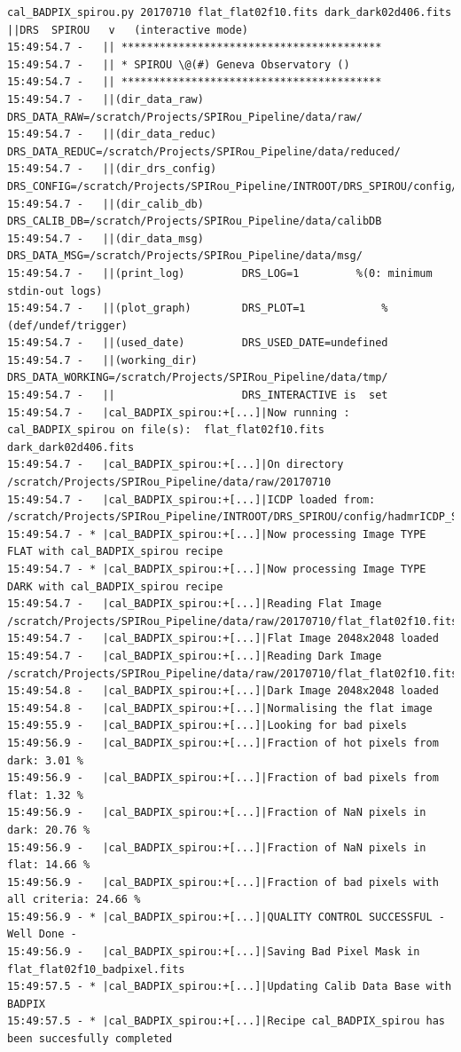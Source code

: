 \begin{lstlisting}[style=text]
cal_BADPIX_spirou.py 20170710 flat_flat02f10.fits dark_dark02d406.fits
||DRS  SPIROU   v   (interactive mode)
15:49:54.7 -   || *****************************************
15:49:54.7 -   || * SPIROU \@(#) Geneva Observatory ()
15:49:54.7 -   || *****************************************
15:49:54.7 -   ||(dir_data_raw)      DRS_DATA_RAW=/scratch/Projects/SPIRou_Pipeline/data/raw/
15:49:54.7 -   ||(dir_data_reduc)    DRS_DATA_REDUC=/scratch/Projects/SPIRou_Pipeline/data/reduced/
15:49:54.7 -   ||(dir_drs_config)    DRS_CONFIG=/scratch/Projects/SPIRou_Pipeline/INTROOT/DRS_SPIROU/config/
15:49:54.7 -   ||(dir_calib_db)      DRS_CALIB_DB=/scratch/Projects/SPIRou_Pipeline/data/calibDB
15:49:54.7 -   ||(dir_data_msg)      DRS_DATA_MSG=/scratch/Projects/SPIRou_Pipeline/data/msg/
15:49:54.7 -   ||(print_log)         DRS_LOG=1         %(0: minimum stdin-out logs)
15:49:54.7 -   ||(plot_graph)        DRS_PLOT=1            %(def/undef/trigger)
15:49:54.7 -   ||(used_date)         DRS_USED_DATE=undefined
15:49:54.7 -   ||(working_dir)       DRS_DATA_WORKING=/scratch/Projects/SPIRou_Pipeline/data/tmp/
15:49:54.7 -   ||                    DRS_INTERACTIVE is  set
15:49:54.7 -   |cal_BADPIX_spirou:+[...]|Now running : cal_BADPIX_spirou on file(s):  flat_flat02f10.fits dark_dark02d406.fits
15:49:54.7 -   |cal_BADPIX_spirou:+[...]|On directory /scratch/Projects/SPIRou_Pipeline/data/raw/20170710
15:49:54.7 -   |cal_BADPIX_spirou:+[...]|ICDP loaded from: /scratch/Projects/SPIRou_Pipeline/INTROOT/DRS_SPIROU/config/hadmrICDP_SPIROU.py
15:49:54.7 - * |cal_BADPIX_spirou:+[...]|Now processing Image TYPE FLAT with cal_BADPIX_spirou recipe
15:49:54.7 - * |cal_BADPIX_spirou:+[...]|Now processing Image TYPE DARK with cal_BADPIX_spirou recipe
15:49:54.7 -   |cal_BADPIX_spirou:+[...]|Reading Flat Image /scratch/Projects/SPIRou_Pipeline/data/raw/20170710/flat_flat02f10.fits
15:49:54.7 -   |cal_BADPIX_spirou:+[...]|Flat Image 2048x2048 loaded
15:49:54.7 -   |cal_BADPIX_spirou:+[...]|Reading Dark Image /scratch/Projects/SPIRou_Pipeline/data/raw/20170710/flat_flat02f10.fits
15:49:54.8 -   |cal_BADPIX_spirou:+[...]|Dark Image 2048x2048 loaded
15:49:54.8 -   |cal_BADPIX_spirou:+[...]|Normalising the flat image
15:49:55.9 -   |cal_BADPIX_spirou:+[...]|Looking for bad pixels
15:49:56.9 -   |cal_BADPIX_spirou:+[...]|Fraction of hot pixels from dark: 3.01 %
15:49:56.9 -   |cal_BADPIX_spirou:+[...]|Fraction of bad pixels from flat: 1.32 %
15:49:56.9 -   |cal_BADPIX_spirou:+[...]|Fraction of NaN pixels in dark: 20.76 %
15:49:56.9 -   |cal_BADPIX_spirou:+[...]|Fraction of NaN pixels in flat: 14.66 %
15:49:56.9 -   |cal_BADPIX_spirou:+[...]|Fraction of bad pixels with all criteria: 24.66 %
15:49:56.9 - * |cal_BADPIX_spirou:+[...]|QUALITY CONTROL SUCCESSFUL - Well Done -
15:49:56.9 -   |cal_BADPIX_spirou:+[...]|Saving Bad Pixel Mask in flat_flat02f10_badpixel.fits
15:49:57.5 - * |cal_BADPIX_spirou:+[...]|Updating Calib Data Base with BADPIX
15:49:57.5 - * |cal_BADPIX_spirou:+[...]|Recipe cal_BADPIX_spirou has been succesfully completed
\end{lstlisting}


